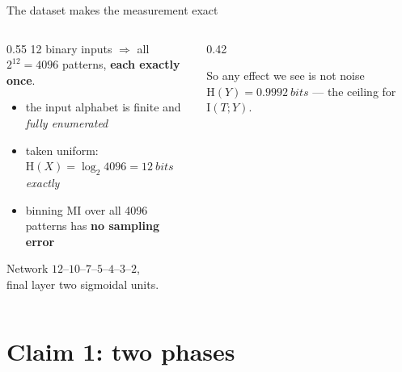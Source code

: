 \documentclass[aspectratio=169,11pt]{beamer}
\newcommand{\I}{\mathrm{I}}
\newcommand{\HH}{\mathrm{H}}
\begin{document}
\begin{frame}{The dataset makes the measurement exact}
\begin{columns}[T]
\begin{column}{0.55\textwidth}
12 binary inputs $\Rightarrow$ all $2^{12}=4096$ patterns, \textbf{each exactly once}.
\begin{itemize}
  \item the input alphabet is finite and \emph{fully enumerated}
  \item taken uniform: $\HH(X)=\log_2 4096 = \SI{12}{bits}$ \emph{exactly}
  \item binning MI over all 4096 patterns has \textbf{no sampling error}
\end{itemize}
\medskip
Network $12$--$10$--$7$--$5$--$4$--$3$--$2$,\\
final layer two sigmoidal units.
\end{column}
\begin{column}{0.42\textwidth}
\begin{block}{So any effect we see is not noise}
$\HH(Y) = \SI{0.9992}{bits}$ --- the ceiling for $\I(T;Y)$.
\end{block}
\end{column}
\end{columns}
\end{frame}

\section{Claim 1: two phases}
\end{document}
